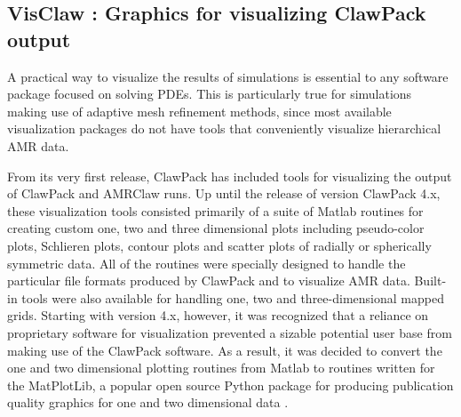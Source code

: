 %
%
%

\newcommand{\cpack}{{\sc ClawPack}\xspace}

\newcommand{\vclaw}{{\sc VisClaw}\xspace}
\newcommand{\aclaw}{{\sc AMRClaw\xspace}\xspace}
\newcommand{\gclaw}{{\sc GeoClaw\xspace}\xspace}
\newcommand{\cclaw}{{\sc Classic Claw}\xspace}
\newcommand{\pclaw}{{\sc PyClaw}\xspace}
\newcommand{\agis}{{\sc ArcGIS}\xspace}
\newcommand{\qgis}{{\sc QGIS}\xspace}

\newcommand{\mlab}{{\sc Matlab}\xspace}
\newcommand{\mplotlib}{{\sc MatPlotLib}\xspace}
\newcommand{\visit}{{\sc VisIt}\xspace}

\subsection{VisClaw : Graphics for visualizing \cpack output}
A practical way to visualize the results of simulations is
essential to any software package focused on solving PDEs.
This is particularly true for simulations making use of adaptive mesh
refinement methods, since most available visualization packages do not
have tools that conveniently visualize hierarchical AMR data.

From its very first release,
\cpack has included tools for visualizing the output of \cpack and
\aclaw runs.  Up until the release of version \cpack 4.x, these
visualization tools consisted primarily of a suite of \mlab routines
for creating custom one, two and three dimensional plots including
pseudo-color plots, Schlieren plots, contour plots and scatter plots
of radially or spherically symmetric data. All of the routines were
specially designed to handle the particular file formats produced by
\cpack and to visualize AMR data.  Built-in tools were also available
for handling one, two and three-dimensional mapped grids.
Starting with version 4.x, however, it was recognized that a reliance
on proprietary software for visualization prevented a sizable
potential user base from making use of the \cpack software.  As a
result, it was decided to convert the one and two dimensional plotting
routines from \mlab to routines written for the \mplotlib,
a popular open source
Python package for producing publication quality graphics
for one and two dimensional data \cite{Hunter:2007}.

